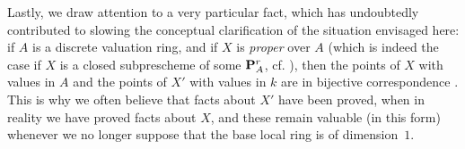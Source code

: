 \begin{env}[3.7.3]
\label{I.3.7.3}
Lastly, we draw attention to a very particular fact, which has undoubtedly contributed to slowing the conceptual clarification of the situation envisaged here: if $A$ is a discrete valuation ring, and if $X$ is \emph{proper} over $A$ (which is indeed the case if $X$ is a closed subprescheme of some $\mathbf{P}_A^r$, cf. ), then the points of $X$ with values in $A$ and the points of $X'$ with values in $k$ are in bijective correspondence .
This is why we often believe that facts about $X'$ have been proved, when in reality we have proved facts about $X$, and these remain valuable (in this form) whenever we no longer suppose that the base local ring is of dimension~$1$.
\end{env}

